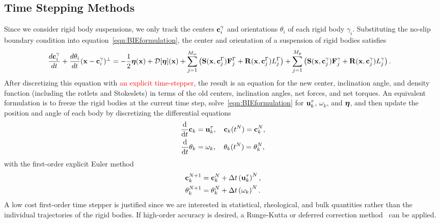 \documentclass[AMA,STIX1COL]{WileyNJD-v2}
\begin{document}
\subsection{Time Stepping Methods}
\label{sec:temporal}
Since we consider rigid body suspensions, we only track the centers
${\mathbf{c}}_i^\gamma$ and orientations $\theta_i$ of each rigid body
$\gamma_i$.  Substituting the no-slip boundary condition into
equation~\eqref{eqn:BIEformulation}, the center and orientation of a
suspension of rigid bodies satisfies
\begin{align*}
  \frac{d{\mathbf{c}}_i^\gamma}{dt} + \frac{d\theta_i}{dt}
    ({\mathbf{x}} - {\mathbf{c}}_i^\gamma)^\perp &=
    -\frac{1}{2}{\boldsymbol\eta}({\mathbf{x}}) + {\mathcal{D}}[{\boldsymbol\eta}]({\mathbf{x}}) + 
    \sum_{j=1}^{M_w} \left(\mathbf{S}({\mathbf{x}},{\mathbf{c}}^\Gamma_j){\mathbf{F}}^\Gamma_j + 
      \mathbf{R}({\mathbf{x}},{\mathbf{c}}^\Gamma_j)L^\Gamma_j\right) 
    +\sum_{j=1}^{M_p} \left(\mathbf{S}({\mathbf{x}},{\mathbf{c}}^\gamma_j){\mathbf{F}}^\gamma_j +
      \mathbf{R}({\mathbf{x}},{\mathbf{c}}^\gamma_j)L^\gamma_j\right).
\end{align*}
After discretizing this equation with  \textcolor{red}{an explicit time-stepper}, the result is an
equation for the new center, inclination angle, and density function
(including the rotlets and Stokeslets) in terms of the old centers,
inclination angles, net forces, and net torques.  An equivalent
formulation is to freeze the rigid bodies at the current time step,
solve~\eqref{eqn:BIEformulation} for ${\mathbf{u}}^\tau_k$, $\omega_k$, and
${\boldsymbol\eta}$, and then update the position and angle of each body by
discretizing the differential equations
\begin{align*}
  \frac{\text{d}}{\text{d}t}{\mathbf{c}}_k &= {\mathbf{u}}^\tau_k,  
    \quad {\mathbf{c}}_k(t^N) = {\mathbf{c}}_k^N, \\
  \frac{\text{d}}{\text{d}t}\theta_k &= \omega_k,
    \quad \theta_k(t^N) = \theta_k^N,
\end{align*}
with the first-order explicit Euler method
\begin{align*}
  {\mathbf{c}}_k^{N+1} &= {\mathbf{c}}_k^N + \Delta t \left({\mathbf{u}}_k^\tau\right)^N, \\
  \theta_k^{N+1} &= \theta_k^N + \Delta t \left(\omega_k\right)^N.
\end{align*}
A low cost first-order time stepper is justified since we are interested
in statistical, rheological, and bulk quantities rather than the
individual trajectories of the rigid bodies.  If high-order accuracy is
desired, a Runge-Kutta or deferred correction method~\cite{Quaife2015,
qua-bir2016} can be applied.
\end{document}
